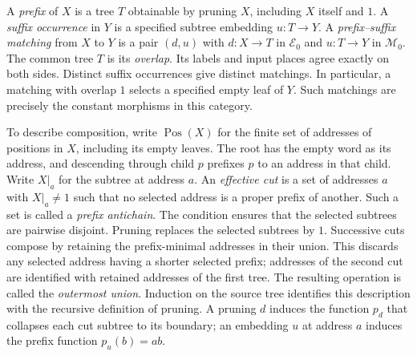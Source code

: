 \documentclass[11pt,a4paper]{article}
\theoremstyle{plain}
\theoremstyle{definition}
\theoremstyle{remark}
\newcommand{\Ocat}{\mathcal M}
\newcommand{\Dcat}{\mathcal E}
\newcommand{\one}{1}
\newcommand{\Pos}{\operatorname{Pos}}
\begin{document}
A \emph{prefix} of $X$ is a tree $T$ obtainable by pruning $X$,
including $X$ itself and $1$. A \emph{suffix occurrence} in $Y$ is
a specified subtree embedding $u:T\to Y$. A \emph{prefix--suffix
matching} from $X$ to $Y$ is a pair $(d,u)$ with
$d:X\to T$ in $\Dcat_0$ and $u:T\to Y$ in $\Ocat_0$.
The common tree $T$ is its \emph{overlap}. Its labels and input places
agree exactly on both sides. Distinct suffix occurrences give distinct
matchings. In particular, a matching with overlap $\one$ selects
a specified empty leaf of $Y$. Such matchings are precisely the
constant morphisms in this category.

To describe composition, write $\Pos(X)$ for the finite set of
addresses of positions in $X$, including its empty leaves. The root
has the empty word as its address, and descending through child $p$
prefixes $p$ to an address in that child. Write $X|_a$ for the
subtree at address $a$.
An \emph{effective cut} is a set of addresses $a$ with
$X|_a\ne\one$ such that no selected address is a proper prefix of
another. Such a set is called a \emph{prefix antichain}. The condition
ensures that the selected subtrees are pairwise disjoint.
Pruning replaces the selected subtrees by $\one$. Successive cuts
compose by retaining the prefix-minimal addresses in their union. This
discards any selected address
having a shorter selected prefix; addresses of the second cut are
identified with retained addresses of the first tree. The resulting operation is called the \emph{outermost union}.
Induction on the source tree identifies this description with the
recursive definition of pruning.
A pruning $d$ induces the function $p_d$ that collapses each cut
subtree to its boundary; an embedding $u$ at address $a$ induces
the prefix function $p_u(b)=ab$.
\end{document}
